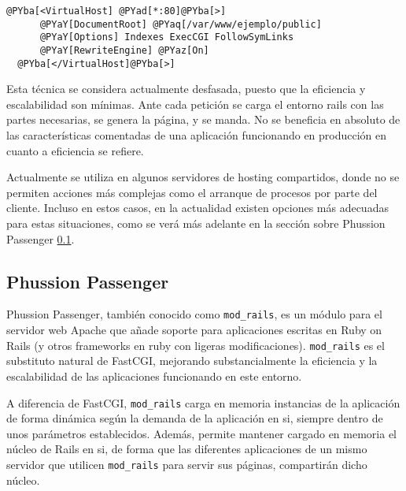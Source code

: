 
\begin{Verbatim}[commandchars=@\[\]]
  @PYba[<VirtualHost] @PYad[*:80]@PYba[>]
      @PYaY[DocumentRoot] @PYaq[/var/www/ejemplo/public]
      @PYaY[Options] Indexes ExecCGI FollowSymLinks
      @PYaY[RewriteEngine] @PYaz[On]
  @PYba[</VirtualHost]@PYba[>]
\end{Verbatim}


Esta técnica se considera actualmente desfasada, puesto que la eficiencia y escalabilidad son mínimas. Ante cada petición se carga el entorno rails con las partes necesarias, se genera la página, y se manda. No se beneficia en absoluto de las características comentadas de una aplicación funcionando en producción en cuanto a eficiencia se refiere.

Actualmente se utiliza en algunos servidores de hosting compartidos, donde no se permiten acciones más complejas como el arranque de procesos por parte del cliente. Incluso en estos casos, en la actualidad existen opciones más adecuadas para estas situaciones, como se verá más adelante en la sección sobre Phussion Passenger \ref{sub:phussion_passenger}.


\subsection{Phussion Passenger} %
\label{sub:phussion_passenger}

Phussion Passenger, también conocido como \texttt{mod\_rails}, es un módulo para el servidor web Apache que añade soporte para aplicaciones escritas en Ruby on Rails (y otros frameworks en ruby con ligeras modificaciones). \texttt{mod\_rails} es el substituto natural de FastCGI, mejorando substancialmente la eficiencia y la escalabilidad de las aplicaciones funcionando en este entorno.

A diferencia de FastCGI, \texttt{mod\_rails} carga en memoria instancias de la aplicación de forma dinámica según la demanda de la aplicación en si, siempre dentro de unos parámetros establecidos. Además, permite mantener cargado en memoria el núcleo de Rails en si, de forma que las diferentes aplicaciones de un mismo servidor que utilicen \texttt{mod\_rails} para servir sus páginas, compartirán dicho núcleo.

